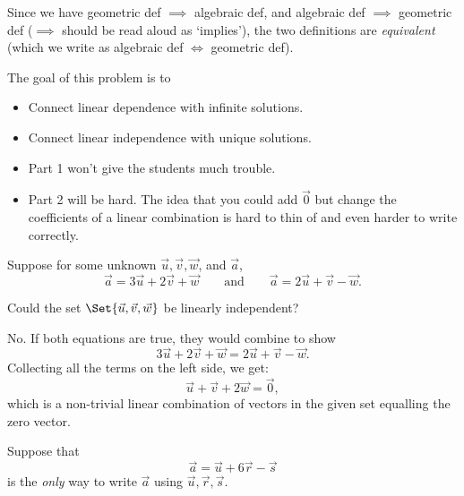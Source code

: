 	Since we have geometric def $\implies$ algebraic def, and algebraic def $\implies$ geometric def
	($\implies$ should be read aloud as `implies'), the two definitions
	are \emph{equivalent} (which we write as algebraic def $\iff$ geometric def).


	\bookonlynewpage
	\question
	\begin{annotation}
		\begin{goals}

			The goal of this problem is to
			\begin{itemize}
				\item Connect linear dependence with infinite solutions.
				\item Connect linear independence with unique solutions.
			\end{itemize}
		\end{goals}

		\begin{notes}
			\begin{itemize}
				\item Part 1 won't give the students much trouble.
				\item Part 2 will be hard. The idea that you could add $\vec 0$
					but change the coefficients of a linear combination
					is hard to thin of and even harder to write correctly.
			\end{itemize}
		\end{notes}
	\end{annotation}
	Suppose for some unknown $\vec u, \vec v, \vec w$, and $\vec a$,
	\[
		\vec a = 3\vec u+2\vec v +\vec w\qquad \text{and}\qquad
		\vec a = 2\vec u+\vec v -\vec w.
	\]
	\begin{parts}
		\item Could the set $\Set{\vec u,\vec v,\vec w}$ be linearly
		independent?
			\begin{solution}
				No. If both equations are true, they would combine to show
				\[
					3\vec u+2\vec v +\vec w = 2\vec u+\vec v -\vec w.
				\]
				Collecting all the terms on the left side, we get:
				\[
					\vec u + \vec v + 2\vec w = \vec 0,
				\]
				which is a non-trivial linear combination of vectors in the given
				set equalling the zero vector.
			\end{solution}
	\end{parts}
	Suppose that
	\[
		\vec a = \vec u+6\vec r-\vec s
	\]
	is the \emph{only} way to write $\vec a$ using $\vec u,\vec r,\vec s$.

